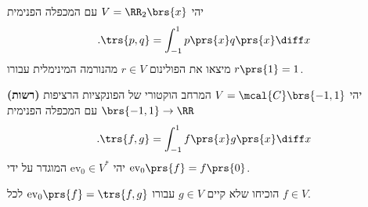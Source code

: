 \documentclass[a4paper,10pt,twoside,openany]{article}
\begin{document}
\begin{exercise}
יהי
$V = \RR_2\brs{x}$
עם המכפלה הפנימית
\begin{align*}
\text{.} \trs{p,q} = \int_{-1}^1 p\prs{x} q\prs{x} \diff x
\end{align*}
מיצאו את הפולינום
$r \in V$
מהנורמה המינימלית עבורו
$r\prs{1} = 1$.
\end{exercise}

\begin{exercise} \textbf{(רשות)}
יהי
$V = \mcal{C}\brs{-1, 1}$
המרחב הוקטורי של הפונקציות הרציפות
$\brs{-1, 1} \to \RR$
עם המכפלה הפנימית
\begin{align*}
\text{.} \trs{f,g} = \int_{-1}^1 f\prs{x} g\prs{x} \diff x
\end{align*}
יהי
$\mathrm{ev}_0 \in V^*$
המוגדר על ידי
$\mathrm{ev}_0\prs{f} = f\prs{0}$.

הוכיחו שלא קיים
$g \in V$
עבורו
$\mathrm{ev}_0\prs{f} = \trs{f,g}$
לכל
$f \in V$.
\end{exercise}
\end{document}
